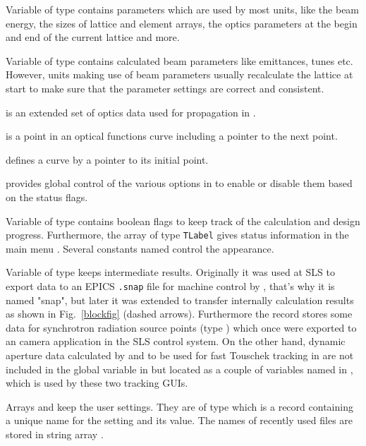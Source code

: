 \documentclass[12pt]{article}
\newcommand\code[1]{{\tt #1}}
\newcommand{\unico}[1]{{\color{burntorange}\code{#1}}}
\newcommand{\opagui}[1]{\colorbox{blue!20}{{\color{black}\code{#1}}}}
\newcommand{\ogui}[1]{\hyperref[#1]{\opagui{#1}}}
\newcommand{\opauni}[1]{\colorbox{orange!30}{{\color{black}\code{#1}}}}
\newcommand{\ouni}[1]{\hyperref[#1]{\opauni{#1}}}
\begin{document}
Variable \unico{Glob} of type \unico{GlobType} contains parameters which are used by most units, like the beam energy, the sizes of lattice and element arrays, the optics parameters at the begin and end of the current lattice and more. 

Variable \unico{Beam} of type \unico{BeamParType} contains calculated beam parameters like emittances, tunes etc. However, units making use of beam parameters usually recalculate the lattice at start to make sure that the parameter settings are correct and consistent.

\unico{OpValType} is an extended set of optics data used for propagation in \ouni{elemlib}.

\unico{CurveType} is a point in an optical functions curve including a pointer to the next point.

\unico{CurvePlotType} defines a curve by a pointer to its initial point.

\unico{MainButtonHandles} provides global control of the various options in \ogui{opamenu} to enable or disable them based on the status flags.

Variable \unico{Status} of type \unico{StatusType} contains boolean flags to keep track of the calculation and design progress. 
Furthermore, the array \unico{StatusLabels} of type \code{TLabel} gives status information in the main menu \ogui{opamenu}. Several constants named \unico{Status\dots} control the appearance.

Variable \unico{SnapSave} of type \unico{SnapSaveType} keeps intermediate results.  Originally it was used at SLS to export data to an EPICS \code{.snap} file for machine control by \ogui{opacurrents}, that's why it is named "snap", but later it was extended to transfer internally calculation results as shown in Fig.~\ref{blockfig} (dashed arrows). 
Furthermore the record stores some data for synchrotron radiation source points (type \unico{XB\_SnapSaveType}) which once were exported to an camera application in the SLS control system. 
On the other hand, dynamic aperture data calculated by \ogui{opatrackda} and to be used for fast Touschek tracking in \ogui{opatracktt} are not included in the global \unico{SnapSave} variable in \unico{globlib} but located as a couple of variables named \unico{Flo\dots} in \unico{tracklib}, which is used by these two tracking GUIs.

Arrays \unico{GlobDef} and \unico{Def} keep the user settings. They are of type \unico{DefaultType} which is a record containing a unique name for the setting and its value. The names of recently  used files are stored in string array \unico{LastUsedFiles}. 
\end{document}
